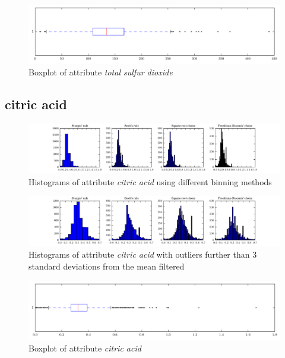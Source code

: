 \documentclass{report}
\begin{document}
\begin{figure}[H]
\includegraphics[width=\textwidth]{boxplots/total_sulfur_dioxide.pdf}
\caption{Boxplot of attribute \emph{total sulfur dioxide}}\end{figure}

\newpage\subsection{citric acid}
\begin{figure}[H]
\includegraphics[width=\textwidth]{histograms/citric_acid.pdf}
\caption{Histograms of attribute \emph{citric acid} using different binning methods}\end{figure}

\begin{figure}[H]
\includegraphics[width=\textwidth]{histograms/citric_acid_filtered.pdf}
\caption{Histograms of attribute \emph{citric acid} with outliers further than 3 standard deviations from the mean filtered}\n\end{figure}

\begin{figure}[H]
\includegraphics[width=\textwidth]{boxplots/citric_acid.pdf}
\caption{Boxplot of attribute \emph{citric acid}}\end{figure}
\end{document}
